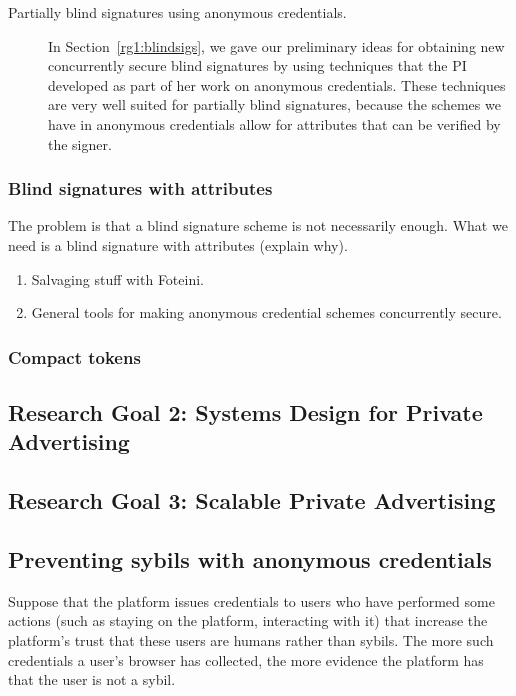 \begin{description}
\item[Partially blind signatures using anonymous credentials.] In Section~\ref{rg1:blindsigs}, we gave our preliminary ideas for obtaining new concurrently secure blind signatures by using techniques that the PI developed as part of her work on anonymous credentials.  These techniques are very well suited for partially blind signatures, because the schemes we have in anonymous credentials allow for attributes that can be verified by the signer.
\end{description}

\subsubsection{Blind signatures with attributes}
\label{rg1:attributes}

The problem is that a blind signature scheme is not necessarily enough.  What we need is a blind signature with attributes (explain why). 

\begin{enumerate}
\item Salvaging stuff with Foteini.
\item General tools for making anonymous credential schemes concurrently secure.  
\end{enumerate}

\subsubsection{Compact tokens}
\label{rg1:compact}


\subsection{Research Goal 2: Systems Design for Private Advertising}

\subsection{Research Goal 3: Scalable Private Advertising}

\subsection{Preventing sybils with anonymous credentials} 
%
Suppose that the platform issues credentials to users who have performed some actions (such as staying on the platform, interacting with it) that increase the platform's trust that these users are humans rather than sybils.  
%
The more such credentials a user's browser has collected, the more evidence the platform has that the user is not a sybil.  

